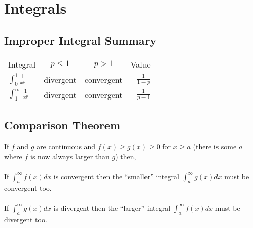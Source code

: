 \documentclass{article}
\begin{document}
\section{Integrals}


\subsection{Improper Integral Summary}

\def\arraystretch{3}
\begin{tabular}{lccr}
    Integral & $p \leq 1$ & $p > 1$ & Value\\
    $\displaystyle\int_{0}^{1} \frac{1}{x^p}$ & divergent & convergent & $\displaystyle\frac{1}{1-p}$\\
    $\displaystyle\int_{1}^{\infty} \frac{1}{x^p}$ & divergent & convergent & $\displaystyle\frac{1}{p-1}$\\
\end{tabular}


\subsection{Comparison Theorem}

If $f$ and $g$ are continuous and
$f(x) \geq g(x) \geq 0$ for $x \geq a$
(there is some $a$ where $f$ is now always larger than $g$)
then,\\
\\
If $\int_{a}^{\infty} f(x)dx$ is convergent then the ``smaller'' integral
$\int_{a}^{\infty} g(x)dx$ must be convergent too.\\
\\
If $\int_{a}^{\infty} g(x)dx$ is divergent then the ``larger'' integral
$\int_{a}^{\infty} f(x)dx$ must be divergent too.\\
\end{document}
